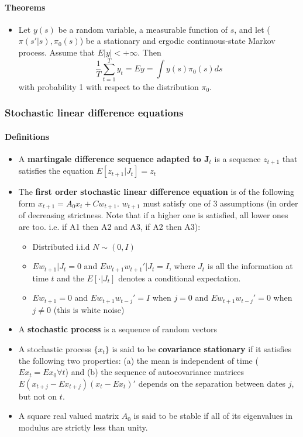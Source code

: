\documentclass[11pt]{article}
\begin{document}
\paragraph{Theorems}
\label{sec-1-1-2-2}


\begin{itemize}
\item Let $y(s)$ be a random variable, a measurable function of $s$, and
  let ($\pi(s'|s), \pi_0(s)$) be a stationary and ergodic
  continuous-state Markov process. Assume that $E|y| < +\infty$. Then
  $$ \frac{1}{T} \sum_{t=1}^T y_t = Ey = \int y(s) \pi_0(s) ds$$ with
  probability 1 with respect to the distribution $\pi_0$.
\end{itemize}
\subsubsection{Stochastic linear difference equations}
\label{sec-1-1-3}
\paragraph{Definitions}
\label{sec-1-1-3-1}


\begin{itemize}
\item A \textbf{martingale difference sequence adapted to J$_t$} is a sequence
  $z_{t+1}$ that satisfies the equation $E[z_{t+1}|J_t] = z_t$
\item The \textbf{first order stochastic linear difference equation} is of the
  following form $x_{t+1} = A_0 x_t + C w_{t+1}$. $w_{t+1}$ must
  satisfy one of 3 assumptions (in order of decreasing
  strictness. Note that if a higher one is satisfied, all lower ones
  are too. i.e. if A1 then A2 and A3, if A2 then A3):
\begin{itemize}
\item Distributed i.i.d $N \sim (0, I)$
\item $Ew_{t+1}|J_t = 0$ and $Ew_{t+1}w_{t+1}'|J_t = I$, where $J_t$ is
    all the information at time $t$ and the $E[\cdot |J_t]$ denotes a
    conditional expectation.
\item $E w_{t+1} = 0$ and $Ew_{t+1}w_{t-j}' = I$ when $j=0$ and
    $Ew_{t+1}w_{t-j}' = 0$ when $j \ne 0$ (this is white noise)
\end{itemize}
\item A \textbf{stochastic process} is a sequence of random vectors
\item A stochastic process $\{x_t\}$ is said to be \textbf{covariance stationary}
  if it satisfies the following two properties: (a) the mean is
  independent of time ($Ex_t = E x_0 \forall t$) and (b) the sequence
  of autocovariance matrices $E(x_{t+j} - Ex_{t+j})(x_t - E x_t)'$
  depends on the separation between dates $j$, but not on $t$.
\item A square real valued matrix $A_0$ is said to be stable if all of its
  eigenvalues in modulus are strictly less than unity.
\end{itemize}
\end{document}
